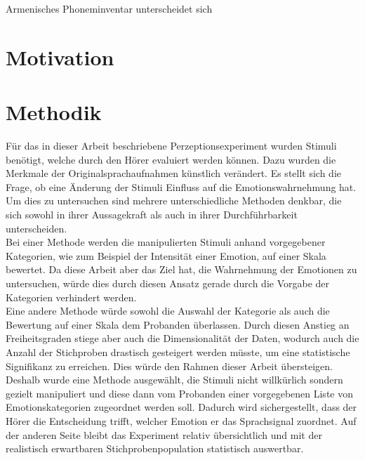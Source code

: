 \documentclass[11pt,a4paper,headsepline,twoside,toc=bibliography]{scrreprt}
\begin{document}
Armenisches Phoneminventar unterscheidet sich 



\section{Motivation}
\label{sec:experimemnt_motivation}

\section{Methodik}
\label{sec:method}

Für das in dieser Arbeit beschriebene Perzeptionsexperiment wurden Stimuli benötigt, welche durch den Hörer evaluiert werden können. Dazu wurden die Merkmale der Originalsprachaufnahmen künstlich verändert. Es stellt sich die Frage, ob eine Änderung der Stimuli Einfluss auf die Emotionswahrnehmung hat.\\


Um dies zu untersuchen sind mehrere unterschiedliche Methoden denkbar, die sich sowohl in ihrer Aussagekraft als auch in ihrer Durchführbarkeit unterscheiden.\\

Bei einer Methode werden die manipulierten Stimuli anhand vorgegebener Kategorien, wie zum Beispiel der Intensität einer Emotion, auf einer Skala bewertet. Da diese Arbeit aber das Ziel hat, die Wahrnehmung der Emotionen zu untersuchen, würde dies durch diesen Ansatz gerade durch die Vorgabe der Kategorien verhindert werden.\\

Eine andere Methode würde sowohl die Auswahl der Kategorie als auch die Bewertung auf einer Skala dem Probanden überlassen. Durch diesen Anstieg an Freiheitsgraden stiege aber auch die Dimensionalität der Daten, wodurch auch die Anzahl der Stichproben drastisch gesteigert werden müsste, um eine statistische Signifikanz zu erreichen. Dies würde den Rahmen dieser Arbeit übersteigen.\\

Deshalb wurde eine Methode ausgewählt, die Stimuli nicht willkürlich sondern gezielt manipuliert und diese dann vom Probanden einer vorgegebenen Liste von Emotionskategorien zugeordnet werden soll. Dadurch wird sichergestellt, dass der Hörer die Entscheidung trifft, welcher Emotion er das Sprachsignal zuordnet. Auf der anderen Seite bleibt das Experiment relativ übersichtlich und mit der realistisch erwartbaren Stichprobenpopulation statistisch auswertbar.
\end{document}
